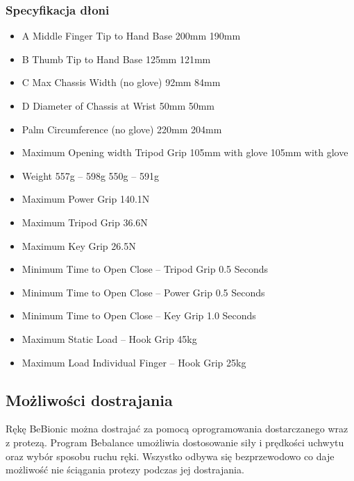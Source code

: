 \documentclass[8pt]{beamer}
\begin{document}
		\begin{frame}
		\frametitle{Specyfikacja dłoni}

		\begin{itemize}
\item A Middle Finger Tip to Hand Base	 200mm	 190mm\\
\item B Thumb Tip to Hand Base	 125mm	 121mm\\
\item C Max Chassis Width (no glove)	 92mm	 84mm\\
\item D Diameter of Chassis at Wrist	 50mm	 50mm\\
\item Palm Circumference (no glove)	 220mm	 204mm\\
\item Maximum Opening width Tripod Grip	 105mm with glove	 105mm with glove\\
\item Weight	 557g – 598g	 550g -- 591g\\
\item Maximum Power Grip	 140.1N\\
\item Maximum Tripod Grip	 36.6N\\
\item Maximum Key Grip	 26.5N\\
\item Minimum Time to Open \/ Close -- Tripod Grip	 0.5 Seconds\\
\item Minimum Time to Open \/ Close -- Power Grip	 0.5 Seconds\\
\item Minimum Time to Open \/ Close -- Key Grip	 1.0 Seconds\\
\item Maximum Static Load -- Hook Grip	 45kg\\
\item Maximum Load Individual Finger -- Hook Grip	 25kg\\
		\end{itemize}		
		\end{frame}				

	\subsection{Możliwości dostrajania}
		\begin{frame}
		
		Rękę BeBionic można dostrajać za pomocą oprogramowania dostarczanego  wraz z protezą.
		Program Bebalance umożliwia dostosowanie siły i prędkości uchwytu oraz wybór sposobu ruchu ręki. Wszystko odbywa się bezprzewodowo co daje możliwość nie ściągania protezy podczas jej dostrajania.

		\end{frame}	
		
\end{document}

